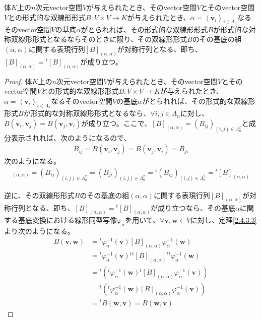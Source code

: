 \documentclass[dvipdfmx]{jsarticle}
\begin{document}
\begin{thm}\label{2.4.3.5}
体$K$上の$n$次元vector空間$V$が与えられたとき、そのvector空間$V$とそのvector空間$V$との形式的な双線形形式$B:V \times V \rightarrow K$が与えられたとき、$\alpha = \left\langle \mathbf{v}_{i} \right\rangle_{i \in \varLambda_{n}}$なるそのvector空間$V$の基底$\alpha$がとられれば、その形式的な双線形形式$B$が形式的な対称双線形形式となるならそのときに限り、その双線形形式$B$のその基底の組$(\alpha,\alpha)$に関する表現行列$[ B]_{(\alpha,\alpha)}$が対称行列となる、即ち、$[ B]_{(\alpha,\alpha)} ={}^{t}[ B]_{(\alpha,\alpha)}$が成り立つ。
\end{thm}
\begin{proof}
体$K$上の$n$次元vector空間$V$が与えられたとき、そのvector空間$V$とそのvector空間$V$との形式的な双線形形式$B:V \times V \rightarrow K$が与えられたとき、$\alpha = \left\langle \mathbf{v}_{i} \right\rangle_{i \in \varLambda_{n}}$なるそのvector空間$V$の基底$\alpha$がとられれば、その形式的な双線形形式$B$が形式的な対称双線形形式となるなら、$\forall i,j \in \varLambda_{n}$に対し、$B\left( \mathbf{v}_{i},\mathbf{v}_{j} \right) = B\left( \mathbf{v}_{j},\mathbf{v}_{i} \right)$が成り立つ。ここで、$[ B]_{(\alpha,\alpha)} = \left( B_{ij} \right)_{(i,j) \in \varLambda_{n}^{2}}$と成分表示されれば、次のようになるので、
\begin{align*}
B_{ij} = B\left( \mathbf{v}_{i},\mathbf{v}_{j} \right) = B\left( \mathbf{v}_{j},\mathbf{v}_{i} \right) = B_{ji}
\end{align*}
次のようになる。
\begin{align*}
[ B]_{(\alpha,\alpha)} = \left( B_{ij} \right)_{(i,j) \in \varLambda_{n}^{2}} = \left( B_{ji} \right)_{(i,j) \in \varLambda_{n}^{2}} ={}^{t}\left( B_{ij} \right)_{(i,j) \in \varLambda_{n}^{2}} ={}^{t}[ B]_{(\alpha,\alpha)}
\end{align*}\par
逆に、その双線形形式$B$のその基底の組$(\alpha,\alpha)$に関する表現行列$[ B]_{(\alpha,\alpha)}$が対称行列となる、即ち、$[ B]_{(\alpha,\alpha)} ={}^{t}[ B]_{(\alpha,\alpha)}$が成り立つなら、その基底$\alpha$に関する基底変換における線形同型写像$\varphi_{\alpha}$を用いて、$\forall\mathbf{v},\mathbf{w} \in V$に対し、定理\ref{2.4.3.3}より次のようになる。
\begin{align*}
B\left( \mathbf{v},\mathbf{w} \right) &={}^{t}\varphi_{\alpha}^{- 1}\left( \mathbf{v} \right)[ B]_{(\alpha,\alpha)}\varphi_{\alpha}^{- 1}\left( \mathbf{w} \right)\\
&={}^{t}\varphi_{\alpha}^{- 1}\left( \mathbf{v} \right){}^{t}{}^{t}[ B]_{(\alpha,\alpha)}{}^{t}{}^{t}\varphi_{\alpha}^{- 1}\left( \mathbf{w} \right)\\
&={}^{t}\left({}^{t}\varphi_{\alpha}^{- 1}\left( \mathbf{w} \right){}^{t}[ B]_{(\alpha,\alpha)}\varphi_{\alpha}^{- 1}\left( \mathbf{v} \right) \right)\\
&={}^{t}\left({}^{t}\varphi_{\alpha}^{- 1}\left( \mathbf{w} \right)[ B]_{(\alpha,\alpha)}\varphi_{\alpha}^{- 1}\left( \mathbf{v} \right) \right)\\
&={}^{t}B\left( \mathbf{w},\mathbf{v} \right) = B\left( \mathbf{w},\mathbf{v} \right)
\end{align*}
\end{proof}
\end{document}
